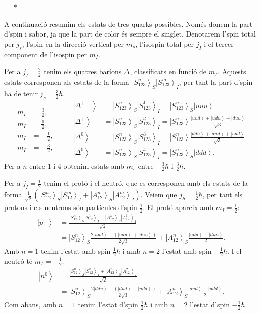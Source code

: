 \documentclass[12pt]{article}
\numberwithin{table}{section}
\numberwithin{figure}{section}
\numberwithin{equation}{section}
\newcommand{\ket}[1]{\left\vert {#1} \right\rangle}
\newcommand{\parbreak}{
	\begin{center}
		--- $\ast$ ---
	\end{center} 
}
\begin{document}
\parbreak

A continuació resumim els estats de tres quarks possibles. Només donem la part d'spin i sabor, ja que la part de color és sempre el singlet. Denotarem l'spin total per \( j_s \), l'spin en la direcció vertical per \( m_s \),  l'isospin total per \( j_I \) i el tercer component de l'isospin per \( m_I \).

Per a \( j_I = \frac{3}{2} \) tenim els quatres barions \( \Delta \), classificats en funció de \( m_I \). Aquests estats corresponen als estats de la forma \( \ket{S_{123}^n}_S \ket{S_{123}^m}_I \), per tant la part d'spin ha de tenir \( j_s = \frac{3}{2}\hbar \). 
\begin{equation*}
	\begin{aligned}
		m_I & = \frac{3}{2}, \\
    m_I & = \frac{1}{2}, \\
    m_I & = -\frac{1}{2}, \\
    m_I & = -\frac{3}{2},
	\end{aligned}
	\qquad
	\begin{aligned}
	 	\ket{\Delta^{++}} & = \ket{S_{123}^n}_S\ket{S_{123}^1}_I = \ket{S_{123}^n}_S \ket{uuu} \\
	 	\ket{\Delta^{+}} & = \ket{S_{123}^n}_S\ket{S_{123}^2}_I = \ket{S_{123}^n} \frac{\ket{uud} + \ket{udu} + \ket{duu}}{\sqrt{3}} \\
	 	\ket{\Delta^{0}} & = \ket{S_{123}^n}_S\ket{S_{123}^3}_I = \ket{S_{123}^n} \frac{\ket{ddu} + \ket{dud} + \ket{udd}}{\sqrt{3}} \\
	 	\ket{\Delta^{0}} & = \ket{S_{123}^n}_S\ket{S_{123}^4}_I = \ket{S_{123}^n}_S \ket{ddd}.
	\end{aligned}
\end{equation*}
Per a \( n \) entre 1 i 4 obtenim estats amb \( m_s \) entre \( -\frac{3}{2}\hbar \) i \( \frac{3}{2}\hbar \).

Per a \( j_I = \frac{1}{2} \) tenim el protó i el neutró, que es corresponen amb els estats de la forma \( \frac{1}{\sqrt{2}}(\ket{S_{12}^n}_S\ket{S_{12}^m}_I + \ket{A_{12}^n}_S\ket{A_{12}^m}_I) \). Veiem que \( j_S = \frac{1}{2}\hbar \), per tant els protons i els neutrons són partícules d'spin \( \frac{1}{2} \). El protó apareix amb \( m_I = \frac{1}{2} \):
\begin{align*}
	\ket{p^+} & = \frac{\ket{S_{12}^n}_S\ket{S_{12}^1}_I + \ket{A_{12}^n}_S\ket{A_{12}^1}_I}{\sqrt{2}} \\
						& = \ket{S_{12}^n}_S \frac{2\ket{uud} - (\ket{udu} + \ket{duu})}{2\sqrt{3}} + \ket{A_{12}^n}_S \frac{\ket{udu} - \ket{duu}}{2}. 
\end{align*}
Amb \( n = 1 \) tenim l'estat amb spin \( \frac{1}{2}\hbar \) i amb \( n = 2 \) l'estat amb spin \( -\frac{1}{2}\hbar \).
I el neutró té \( m_I = -\frac{1}{2} \):
\begin{align*}
	\ket{n^0} & = \frac{\ket{S_{12}^n}_S\ket{S_{12}^2}_I + \ket{A_{12}^n}_S\ket{A_{12}^2}_I}{\sqrt{2}} \\
						& = \ket{S_{12}^n}_S \frac{2\ket{ddu} - (\ket{dud} + \ket{udd})}{2\sqrt{3}} + \ket{A_{12}^n}_S \frac{\ket{dud} - \ket{udd}}{2}. 
\end{align*}
Com abans, amb \( n = 1 \) tenim l'estat d'spin \( \frac{1}{2}\hbar \) i amb \( n = 2 \) l'estat d'spin \( -\frac{1}{2}\hbar \).
\end{document}
